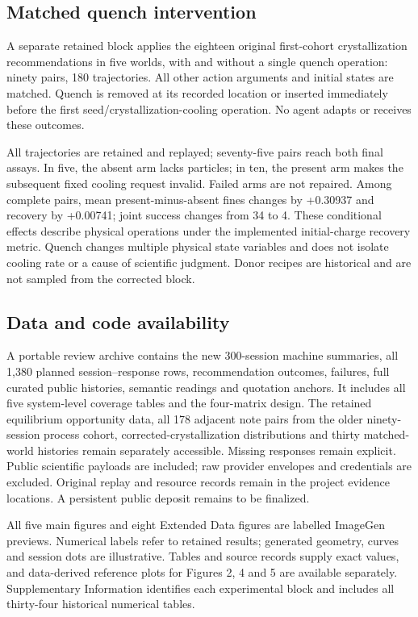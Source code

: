 \documentclass[10pt,a4paper]{article}
\begin{document}
\subsection{Matched quench intervention}\label{matched-quench-intervention}

A separate retained block applies the eighteen original first-cohort crystallization recommendations in five worlds, with and without a single quench operation: ninety pairs, 180 trajectories. All other action arguments and initial states are matched. Quench is removed at its recorded location or inserted immediately before the first seed/crystallization-cooling operation. No agent adapts or receives these outcomes.

All trajectories are retained and replayed; seventy-five pairs reach both final assays. In five, the absent arm lacks particles; in ten, the present arm makes the subsequent fixed cooling request invalid. Failed arms are not repaired. Among complete pairs, mean present-minus-absent fines changes by +0.30937 and recovery by +0.00741; joint success changes from 34 to 4. These conditional effects describe physical operations under the implemented initial-charge recovery metric. Quench changes multiple physical state variables and does not isolate cooling rate or a cause of scientific judgment. Donor recipes are historical and are not sampled from the corrected block.

\subsection{Data and code availability}\label{data-and-code-availability}

A portable review archive contains the new 300-session machine summaries, all 1,380 planned session--response rows, recommendation outcomes, failures, full curated public histories, semantic readings and quotation anchors. It includes all five system-level coverage tables and the four-matrix design. The retained equilibrium opportunity data, all 178 adjacent note pairs from the older ninety-session process cohort, corrected-crystallization distributions and thirty matched-world histories remain separately accessible. Missing responses remain explicit. Public scientific payloads are included; raw provider envelopes and credentials are excluded. Original replay and resource records remain in the project evidence locations. A persistent public deposit remains to be finalized.

All five main figures and eight Extended Data figures are labelled ImageGen previews. Numerical labels refer to retained results; generated geometry, curves and session dots are illustrative. Tables and source records supply exact values, and data-derived reference plots for Figures 2, 4 and 5 are available separately. Supplementary Information identifies each experimental block and includes all thirty-four historical numerical tables.
\end{document}
